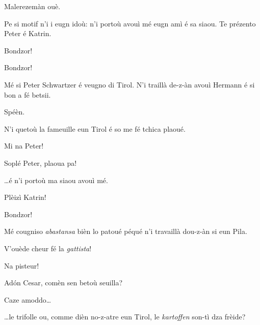 \begin{drama}
\Cesarspeaks Malerezemàn ouè.

\Hermannspeaks Pe si motif n'i i eugn idoù: n'i portoù avouì mé eugn amì é sa siaou. Te prézento Peter é Katrin. 


\Peterspeaks{} Bondzor!

\Cesarspeaks Bondzor!

\Peterspeaks Mé si Peter Schwartzer é veugno di Tirol. N'i traillà de-z-àn avouì Hermann é si bon a fé betsii.

\Cesarspeaks Spéèn.

\Peterspeaks N'i quetoù la fameuille eun Tirol é so me fé tchica plaoué.


\Cesarspeaks Mi na Peter!


\Hermannspeaks Soplé Peter, plaoua pa!


\Peterspeaks  \ldots é n'i portoù ma siaou avouì mé.


\Katrinspeaks{} Plèizì Katrin!

\Cesarspeaks{} Bondzor!

\Katrinspeaks Mé cougniso \textit{abastansa} bièn lo patoué péqué n'i travaillà dou-z-àn si eun Pila.

\Cesarspeaks  V'ouède cheur fé la \textit{gattista}!

\Katrinspeaks Na pisteur!

\Hermannspeaks{} Ad\'on Cesar, comèn sen betoù seuilla?

\Cesarspeaks Caze amoddo\ldots

\Hermannspeaks{} \ldots le trifolle ou, comme dièn no-z-atre eun Tirol, le \textit{kartoffen} son-tì dza frèide?


\end{drama}
